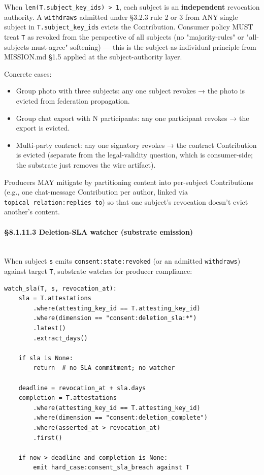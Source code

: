 \documentclass[10pt]{article}
\begin{document}
When \texttt{len(T.subject\_key\_ids) > 1}, each subject is an \textbf{independent} revocation authority. A \texttt{withdraws} admitted under §3.2.3 rule 2 or 3 from ANY single subject in \texttt{T.subject\_key\_ids} evicts the Contribution. Consumer policy MUST treat \texttt{T} as revoked from the perspective of all subjects (no "majority-rules" or "all-subjects-must-agree" softening) — this is the subject-as-individual principle from MISSION.md §1.5 applied at the subject-authority layer.


Concrete cases:

\begin{itemize}\setlength\itemsep{0pt}
\item Group photo with three subjects: any one subject revokes → the photo is evicted from federation propagation.
\item Group chat export with N participants: any one participant revokes → the export is evicted.
\item Multi-party contract: any one signatory revokes → the contract Contribution is evicted (separate from the legal-validity question, which is consumer-side; the substrate just removes the wire artifact).
\end{itemize}


Producers MAY mitigate by partitioning content into per-subject Contributions (e.g., one chat-message Contribution per author, linked via \texttt{topical\_relation:replies\_to}) so that one subject's revocation doesn't evict another's content.


\paragraph{§8.1.11.3 Deletion-SLA watcher (substrate emission)}\mbox{}\\


When subject \texttt{s} emits \texttt{consent:state:revoked} (or an admitted \texttt{withdraws}) against target \texttt{T}, substrate watches for producer compliance:


\begin{lstlisting}
watch_sla(T, s, revocation_at):
    sla = T.attestations
        .where(attesting_key_id == T.attesting_key_id)
        .where(dimension == "consent:deletion_sla:*")
        .latest()
        .extract_days()

    if sla is None:
        return  # no SLA commitment; no watcher

    deadline = revocation_at + sla.days
    completion = T.attestations
        .where(attesting_key_id == T.attesting_key_id)
        .where(dimension == "consent:deletion_complete")
        .where(asserted_at > revocation_at)
        .first()

    if now > deadline and completion is None:
        emit hard_case:consent_sla_breach against T
\end{lstlisting}
\end{document}
